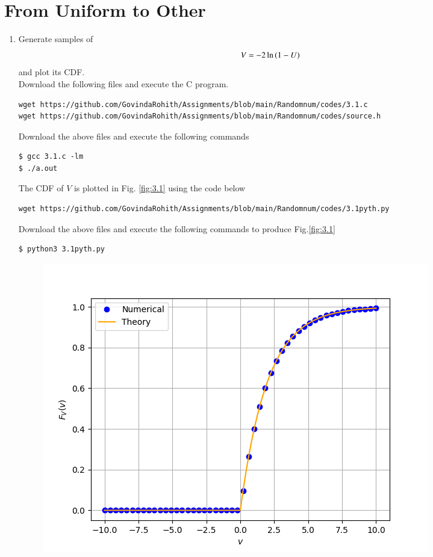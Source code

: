 \documentclass[journal,12pt,twocolumn]{IEEEtran}
\renewcommand\thesection{\arabic{section}}
\begin{document}
\section{From Uniform to Other}
\begin{enumerate}[label=\thesection.\arabic*
,ref=\thesection.\theenumi]
%
\item
Generate samples of 
%
\begin{equation}
V = -2\ln\left(1-U\right)
\end{equation}
%
and plot its CDF.  \\
\solution Download the following files and execute the  C program.
\begin{lstlisting}
wget https://github.com/GovindaRohith/Assignments/blob/main/Randomnum/codes/3.1.c
wget https://github.com/GovindaRohith/Assignments/blob/main/Randomnum/codes/source.h
\end{lstlisting}
Download the above files and execute the following commands
\begin{lstlisting}
$ gcc 3.1.c -lm
$ ./a.out
\end{lstlisting}
The CDF of $V$ is plotted in Fig. \ref{fig:3.1} using the code below
\begin{lstlisting}
wget https://github.com/GovindaRohith/Assignments/blob/main/Randomnum/codes/3.1pyth.py
\end{lstlisting}
Download the above files and execute the following commands to produce Fig.\ref{fig:3.1}
\begin{lstlisting}
$ python3 3.1pyth.py
\end{lstlisting}
\begin{figure}[!h]
\centering
\includegraphics[width=\columnwidth]{./figs/3.1.png}

\end{figure}
\end{enumerate}
\end{document}
